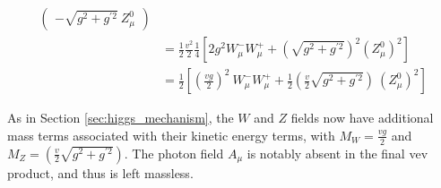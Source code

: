 \begin{equation}
\begin{split}
\begin{pmatrix}
                     - \sqrt{g^2 + g^{\prime 2}}\ Z^0_{\mu}
                \end{pmatrix} \\
            & = \frac{1}{2} \frac{v^2}{2} \frac{1}{4} 
                \left[ 2 g^2  W^-_{\mu} W^+_{\mu}
                + \left(\sqrt{g^2 + g^{\prime 2}}\right)^2 (Z^0_{\mu})^2 \right] \\
            & = \frac{1}{2} \left[ \left(\frac{vg}{2}\right)^2\  W^-_{\mu} W^+_{\mu}
                + \frac{1}{2} \left(\frac{v}{2}\sqrt{g^2 + g^{\prime 2}}\right)\ (Z^0_{\mu})^2 \right]
        \end{split} \end{equation}

        As in Section \ref{sec:higgs_mechanism}, the $W$ and $Z$ fields now have additional mass terms associated with their kinetic energy terms,
            with $M_W = \frac{vg}{2}$ and $M_Z = \left(\frac{v}{2}\sqrt{g^2 + g^{\prime 2}}\right) $.
        The photon field $A_{\mu}$ is notably absent in the final vev product, and thus is left massless.










        




%
%

